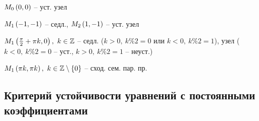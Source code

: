 \begin{enumsols}
		\label{sol:stability_points:types_general_hard}
		\item \( M_0 \left( 0, 0 \right) \) -- уст. узел %
		\item \( M_1 \left( -1, -1 \right) \) -- седл., \( M_2 \left( 1, -1 \right) \) -- уст. узел %
		\item \( M_1 \left( \frac{\pi}{2} + \pi k, 0 \right), ~ k \in \mathbb{Z} \) -- седл. ($k > 0, ~ k \% 2 = 0$ или $k < 0, ~ k \% 2 = 1$), узел ($k < 0, ~ k \% 2 = 0$ -- уст., $k > 0, ~ k \% 2 = 1$ -- неуст.) %
		\item \( M_1 \left( \pi k, \pi k \right), ~ k \in \mathbb{Z} \setminus \left\lbrace 0 \right\rbrace \) -- сход. сем. пар. пр. %

	\end{enumsols}

\subsection*{Критерий устойчивости уравнений с постоянными коэффициентами}

